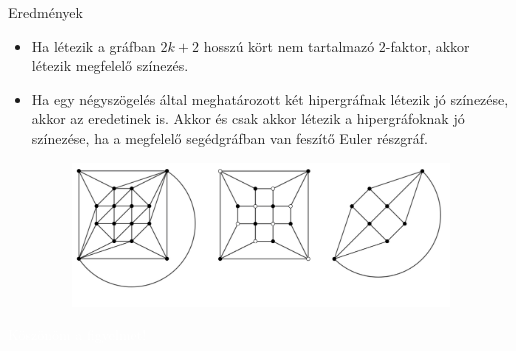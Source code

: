 \documentclass{beamer}
\begin{document}
\begin{frame}{Eredmények}
	\begin{itemize}
		\item Ha létezik a gráfban $2k+2$ hosszú kört nem tartalmazó $2$-faktor, akkor létezik
		megfelelő színezés.
		\item Ha egy négyszögelés által meghatározott két hipergráfnak létezik jó színezése,
		akkor az eredetinek is. Akkor és csak akkor létezik a hipergráfoknak jó színezése,
		ha a megfelelő segédgráfban van feszítő Euler részgráf.
		\begin{figure}[h]
			\centering
			\includegraphics[width=100mm]{hypergraph2}
			\label{fig:sungraph}
		\end{figure}
	\end{itemize}
\end{frame}

{
	\begin{frame}[plain]
		\begin{center}
			\textcolor{white}{\Huge{Köszönöm a figyelmet!}}
		\end{center}
	\end{frame}
}
\end{document}
